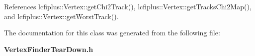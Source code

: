 References lcfiplus\-::\-Vertex\-::get\-Chi2\-Track(), lcfiplus\-::\-Vertex\-::get\-Tracks\-Chi2\-Map(), and lcfiplus\-::\-Vertex\-::get\-Worst\-Track().



The documentation for this class was generated from the following file\-:\begin{DoxyCompactItemize}
\item 
{\bf Vertex\-Finder\-Tear\-Down.\-h}\end{DoxyCompactItemize}
